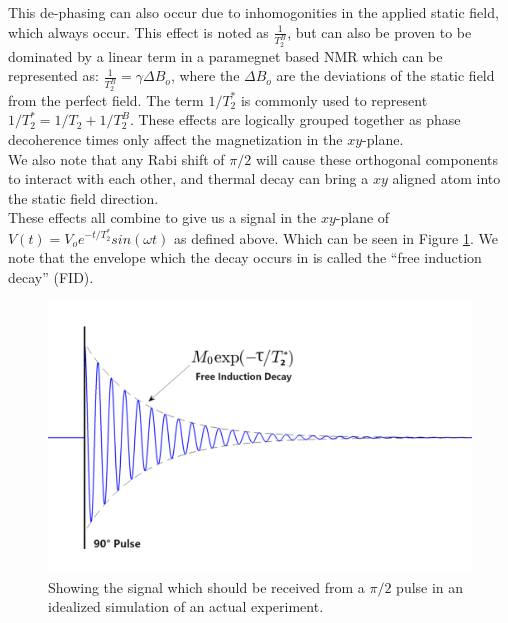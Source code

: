 This de-phasing can also occur due to inhomogonities in the applied static field, which always occur. This effect is noted as $\frac{1}{T^B_2}$, but can also be proven to be dominated by a linear term in a paramegnet based NMR which can be represented as: $\frac{1}{T^B_2} = \gamma \Delta B_o$, where the $\Delta B_o$ are the deviations of the static field from the perfect field. The term $1/T^*_2$ is commonly used to represent $1/T^*_2 = 1/T_2 +  1/T^B_2$. These effects are logically grouped together as phase decoherence times only affect the magnetization in the $xy$-plane.\\

We also note that any Rabi shift of $\pi/2$ will cause these orthogonal components to interact with each other, and thermal decay can bring a $xy$ aligned atom into the static field direction.\\

These effects all combine to give us a signal in the $xy$-plane of  $V(t) = V_o e^{-t/T_2^*} sin(\omega t)$ as defined above. Which can be seen in Figure \ref{fig:FID}. We note that the envelope which the decay occurs in is called the ``free induction decay'' (FID).

\begin{figure}[H]
    \centering
    \includegraphics[width=.75\textwidth]{figures/FID_diagram_v2.png}
    \caption{Showing the signal which should be received from a $\pi/2$ pulse in an idealized simulation of an actual experiment.}
    \label{fig:FID}
\end{figure}


